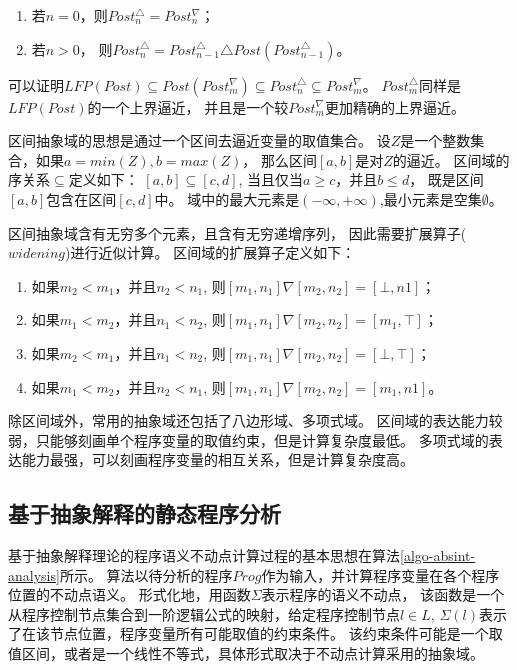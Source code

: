 \begin{enumerate}
	\item 若$n=0$，则$Post_{n}^{\triangle} = Post_{n}^{\nabla}$；
	\item 若$n > 0$，
	则$Post_{n}^{\triangle} = Post_{n-1}^{\triangle} \triangle Post(Post_{n-1}^{\triangle})$。
\end{enumerate}

可以证明$LFP(Post) \subseteq Post(Post_{m}^{\nabla}) 
\subseteq  Post_{n}^{\triangle} \subseteq Post_{m}^{\nabla}$。
$Post_{m}^{\triangle}$同样是$LFP(Post)$的一个上界逼近，
并且是一个较$Post_{m}^{\nabla}$更加精确的上界逼近。


\begin{example}
	区间抽象域的思想是通过一个区间去逼近变量的取值集合。
	设$Z$是一个整数集合，如果$a=min(Z), b=max(Z)$，
	那么区间$[a,b]$是对$Z$的逼近。
	区间域的序关系$\subseteq$定义如下： $[a,b] \subseteq [c,d]$,
	当且仅当$a \geq c$，并且$b \leq d$，
	既是区间$[a,b]$包含在区间$[c,d]$中。
	域中的最大元素是$(-\infty, +\infty)$,最小元素是空集$\emptyset$。
	
	区间抽象域含有无穷多个元素，且含有无穷递增序列，
	因此需要扩展算子($widening$)进行近似计算。
	区间域的扩展算子定义如下：
	
	\begin{enumerate}
	\item 如果$m_2 < m_1$，并且$n_2 < n_1$,		
	则$[m_1, n_1] \nabla [m_2, n_2] = [\bot, n1]$；
	\item 如果$m_1 < m_2$，并且$n_1 < n_2$,
	则$[m_1, n_1] \nabla [m_2, n_2] = [m_1, \top]$；
	\item 如果$m_2 < m_1$，并且$n_1 < n_2$,
	则$[m_1, n_1] \nabla [m_2, n_2] = [\bot, \top]$；
	\item  如果$m_1 < m_2$，并且$n_2 < n_1$,
	则$[m_1, n_1] \nabla [m_2, n_2] = [m_1, n1]$。
	\end{enumerate}
\end{example}

除区间域外，常用的抽象域还包括了八边形域、多项式域。
区间域的表达能力较弱，只能够刻画单个程序变量的取值约束，但是计算复杂度最低。
多项式域的表达能力最强，可以刻画程序变量的相互关系，但是计算复杂度高。

\subsection{基于抽象解释的静态程序分析}

基于抽象解释理论的程序语义不动点计算过程的基本思想在算法\ref{algo-absint-analysis}所示。
算法以待分析的程序$Prog$作为输入，并计算程序变量在各个程序位置的不动点语义。
形式化地，用函数$\Sigma$表示程序的语义不动点，
该函数是一个从程序控制节点集合到一阶逻辑公式的映射，给定程序控制节点$l\in L$,
$\Sigma(l)$表示了在该节点位置，程序变量所有可能取值的约束条件。
该约束条件可能是一个取值区间，或者是一个线性不等式，具体形式取决于不动点计算采用的抽象域。


